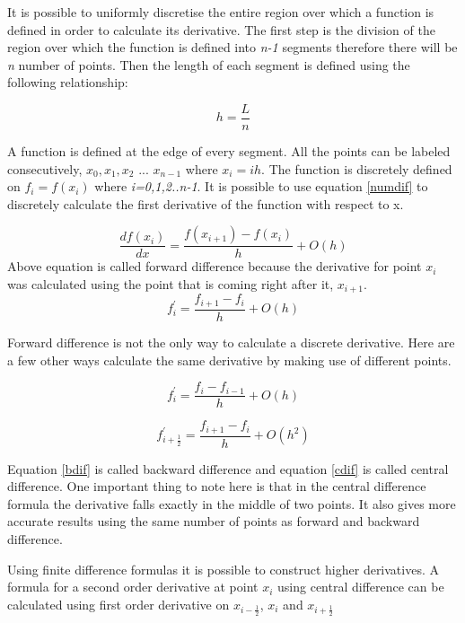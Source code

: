 \begin{doublespace}
It is possible to uniformly discretise the entire region over which a function is defined in order to calculate its derivative. The first step is the division of the region over which the function is defined into \textit{n-1} segments therefore there will be \textit{n} number of points. Then the length of each segment is defined using the following relationship:

\begin{equation}
h=\frac{L}{n}
\end{equation}

A function is defined at the edge of every segment. All the points can be labeled consecutively, $x_0,x_1,x_2$ ... $x_{n-1}$ where $x_i=ih$. The function is discretely defined on \textit{$f_{i}=f(x_{i})$} where\textit{ i=0,1,2..n-1}. It is possible to use equation  \ref{numdif} to discretely calculate the first derivative of the function with respect to x.

\begin{equation}
\frac{df(x_i)}{dx}=\frac{f(x_{i+1})-f(x_i)}{h} + O(h)
\end{equation}
Above equation is called forward difference because the derivative for point $x_i$ was calculated using the point that is coming right after it, $x_{i+1}$.
\begin{equation}
f^{'}_i=\frac{f_{i+1}-f_i}{h}+ O(h)
\end{equation}

Forward difference is not the only way to calculate a discrete derivative. Here are a few other ways calculate the same derivative by making use of different points.

\begin{equation}
f^{'}_i=\frac{f_{i}-f_{i-1}}{h}+ O(h)
\label{bdif}
\end{equation}

\begin{equation}
f^{'}_{i+\frac{1}{2}}=\frac{f_{i+1}-f_i}{h}+ O(h^2)
\label{cdif}
\end{equation}

Equation \ref{bdif} is called backward difference and equation \ref{cdif} is called central difference. One important thing to note here is that in the central difference formula the derivative falls exactly in the middle of two points. It also gives more accurate results using the same number of points as forward and backward difference. 

Using finite difference formulas it is possible to construct higher derivatives. A formula for a second order derivative at point $x_i$ using central difference can be calculated using first order derivative on $x_{i-\frac{1}{2}}$, $x_i$ and $x_{i+\frac{1}{2}}$  


\end{doublespace}
